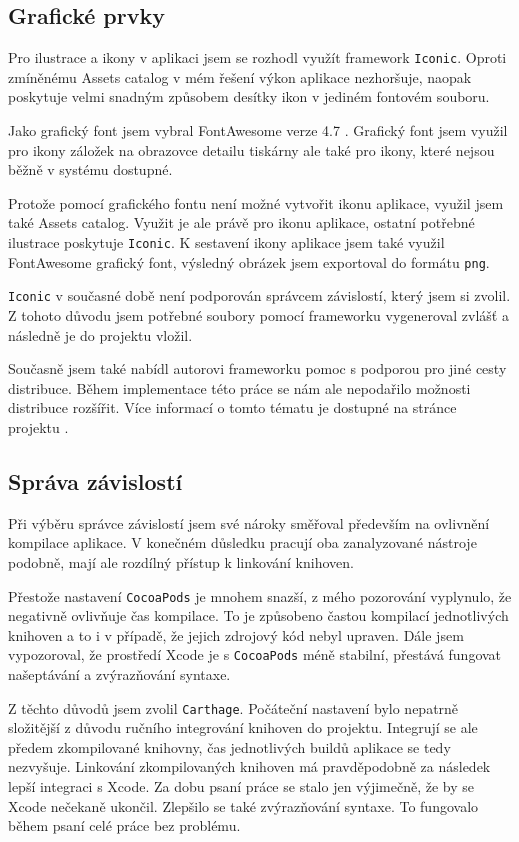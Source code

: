 \subsection{Grafické prvky}

Pro ilustrace a ikony v aplikaci jsem se rozhodl využít framework \texttt{Iconic}.
Oproti zmíněnému Assets catalog v mém řešení výkon aplikace nezhoršuje, naopak poskytuje velmi snadným způsobem desítky ikon v jediném fontovém souboru.

Jako grafický font jsem vybral FontAwesome verze 4.7 \cite{fontawesome-web}.
Grafický font jsem využil pro ikony záložek na obrazovce detailu tiskárny ale také pro ikony, které nejsou běžně v systému dostupné.

Protože pomocí grafického fontu není možné vytvořit ikonu aplikace, využil jsem také Assets catalog.
Využit je ale právě pro ikonu aplikace, ostatní potřebné ilustrace poskytuje \texttt{Iconic}.
K sestavení ikony aplikace jsem také využil FontAwesome grafický font, výsledný obrázek jsem exportoval do formátu \texttt{png}.

\texttt{Iconic} v současné době není podporován správcem závislostí, který jsem si zvolil.
Z tohoto důvodu jsem potřebné soubory pomocí frameworku vygeneroval zvlášť a následně je do projektu vložil.

Současně jsem také nabídl autorovi frameworku pomoc s podporou pro jiné cesty distribuce.
Během implementace této práce se nám ale nepodařilo možnosti distribuce rozšířit.
Více informací o tomto tématu je dostupné na stránce projektu \cite{github-iconic-brew}.

\subsection{Správa závislostí}

Při výběru správce závislostí jsem své nároky směřoval především na ovlivnění kompilace aplikace.
V konečném důsledku pracují oba zanalyzované nástroje podobně, mají ale rozdílný přístup k linkování knihoven.

Přestože nastavení \texttt{CocoaPods} je mnohem snazší, z mého pozorování vyplynulo, že negativně ovlivňuje čas kompilace.
To je způsobeno častou kompilací jednotlivých knihoven a to i v případě, že jejich zdrojový kód nebyl upraven.
Dále jsem vypozoroval, že prostředí Xcode je s \texttt{CocoaPods} méně stabilní, přestává fungovat našeptávání a zvýrazňování syntaxe.

Z těchto důvodů jsem zvolil \texttt{Carthage}.
Počáteční nastavení bylo nepatrně složitější z důvodu ručního integrování knihoven do projektu.
Integrují se ale předem zkompilované knihovny, čas jednotlivých buildů aplikace se tedy nezvyšuje.
Linkování zkompilovaných knihoven má pravděpodobně za následek lepší integraci s Xcode.
Za dobu psaní práce se stalo jen výjimečně, že by se Xcode nečekaně ukončil.
Zlepšilo se také zvýrazňování syntaxe.
To fungovalo během psaní celé práce bez problému.

